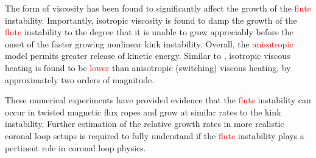 \documentclass[12pt]{article}
\newcommand{\rs}[2]{\textcolor{red}{#2}}
\begin{document}
The form of viscosity has been found to significantly affect the
growth of the \rs{fluting}{flute} instability. Importantly, isotropic
viscosity is found to damp the growth of the \rs{fluting}{flute}
instability to the degree that it is unable to grow appreciably before
the onset of the faster growing nonlinear kink instability. Overall,
the \rs{switching}{anisotropic} model permits greater release of
kinetic energy. Similar to \rs{chapter}{}
\cite{quinnEffectAnisotropicViscosity2020a}, isotropic viscous heating
is found to be \rs{significantly lower}{lower} than anisotropic (switching)
viscous heating, by approximately two orders of magnitude. 

These numerical experiments have provided evidence that the \rs{fluting}{flute} instability can occur in twisted magnetic flux ropes and grow at similar rates to the kink instability. Further estimation of the relative growth rates in more realistic coronal loop setups is required to fully understand if the \rs{fluting}{flute} instability plays a pertinent role in coronal loop physics.

\printbibliography
\end{document}
